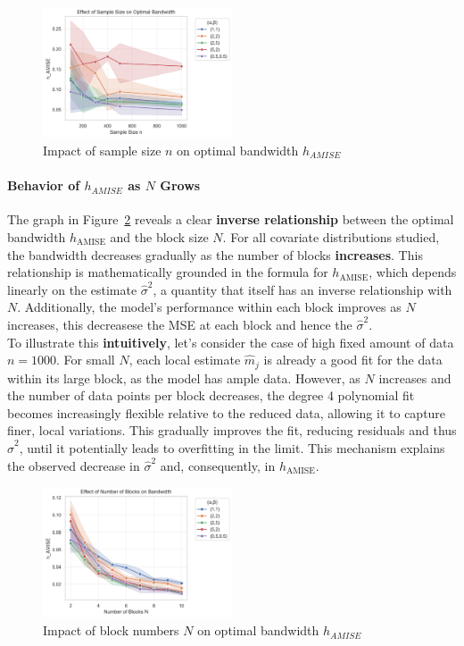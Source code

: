 \documentclass{article}
\begin{document}
\begin{figure}[H]
\centering
\includegraphics[width=0.5\textwidth]{plot1_sample_size_effect.png}
\caption{Impact of sample size $n$ on optimal bandwidth $h_{AMISE}$}
\label{fig:sample_size}
\end{figure}


\paragraph{Behavior of $h_{AMISE}$ as $N$ Grows} The graph in Figure~\ref{fig:block_N} reveals a clear \textbf{inverse relationship} between the optimal bandwidth $h_{\text{AMISE}}$ and the block size $N$. For all covariate distributions studied, 
the bandwidth decreases gradually as the number of blocks \textbf{increases}. This relationship is mathematically grounded in the formula for $h_{\text{AMISE}}$, which depends linearly on the estimate $\hat{\sigma}^2$, a quantity that itself has an inverse 
relationship with $N$. Additionally, the model's performance within each block improves as $N$ increases, this decreasese the MSE at each block and hence the $\hat{\sigma}^2$. \\

To illustrate this \textbf{intuitively}, let's consider the case of high fixed amount of data $n=1000$.  For small $N$, each local estimate $\hat{m}_j$ is already a good fit for the data within its large block, as the model has ample data. 
However, as $N$ increases and the number of data points per block decreases, the degree 4 polynomial fit becomes increasingly flexible relative to the reduced data, allowing it to capture finer, local variations. 
This gradually improves the fit, reducing residuals and thus $\hat{\sigma}^2$, until it potentially leads to overfitting in the limit. This mechanism explains the observed decrease in $\hat{\sigma}^2$ and, consequently, in $h_{\text{AMISE}}$. 

\begin{figure}[H]
\centering
\includegraphics[width=0.5\textwidth]{plot2_block_size_effect.png}
\caption{Impact of block numbers $N$ on optimal bandwidth $h_{AMISE}$}
\label{fig:block_N}
\end{figure}
\end{document}

